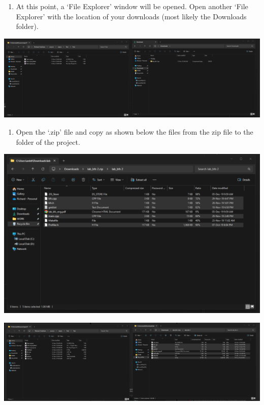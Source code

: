 \documentclass[../en-fa-lab.tex]{subfiles}
\begin{document}
\begin{enumerate}
\def\labelenumi{\arabic{enumi}.}
\setcounter{enumi}{2}
\item
  At this point, a `File Explorer' window will be opened. Open another
  `File Explorer' with the location of your downloads (most likely the
  Downloads folder).
\end{enumerate}

\includegraphics[width=\textwidth,alt={A screenshot of a computer Description automatically generated}]{./Resources/tutorial_lab9/image3.png}

\begin{enumerate}
\def\labelenumi{\arabic{enumi}.}
\setcounter{enumi}{3}
\item
  Open the `.zip' file and copy as shown below the files from the zip
  file to the folder of the project.
\end{enumerate}

\includegraphics[width=\textwidth,alt={A screenshot of a computer Description automatically generated}]{./Resources/tutorial_lab9/image4.png}

\includegraphics[width=\textwidth,alt={A screenshot of a computer Description automatically generated}]{./Resources/tutorial_lab9/image5.png}
\end{document}
